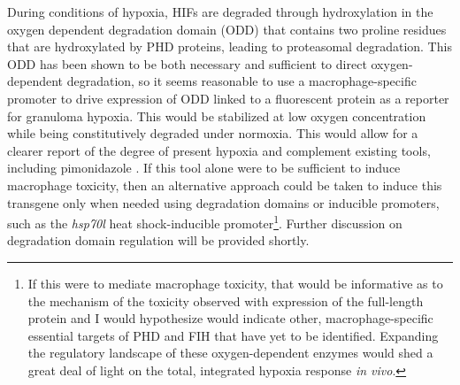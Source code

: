 During conditions of hypoxia, HIFs are degraded through hydroxylation in the oxygen dependent degradation domain (ODD) that contains two proline residues that are hydroxylated by PHD proteins, leading to proteasomal degradation. This ODD has been shown to be both necessary and sufficient to direct oxygen\hyp{}dependent degradation, so it seems reasonable to use a macrophage\hyp{}specific promoter to drive expression of ODD linked to a fluorescent protein as a reporter for granuloma hypoxia. This would be stabilized at low oxygen concentration while being constitutively degraded under normoxia. This would allow for a clearer report of the degree of present hypoxia and complement existing tools, including pimonidazole \citep{Cousins2016, Huang1998}. If this tool alone were to be sufficient to induce macrophage toxicity, then an alternative approach could be taken to induce this transgene only when needed using degradation domains or inducible promoters, such as the \textit{hsp70l} heat shock\hyp{}inducible promoter\footnote{If this were to mediate macrophage toxicity, that would be informative as to the mechanism of the toxicity observed with expression of the full-length protein and I would hypothesize would indicate other, macrophage-specific essential targets of PHD and FIH that have yet to be identified. Expanding the regulatory landscape of these oxygen-dependent enzymes would shed a great deal of light on the total, integrated hypoxia response \textit{in vivo}.}. Further discussion on degradation domain regulation will be provided shortly.

